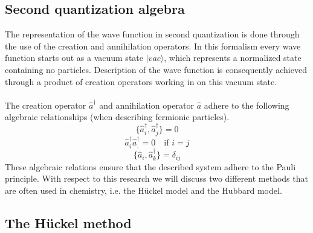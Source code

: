 \documentclass[12pt]{article}
\begin{document}
\subsection{Second quantization algebra}
The representation of the wave function in second quantization is done through the use of the creation and annihilation operators. In this formalism every wave function starts out as a vacuum state $\lvert vac \rangle$, which represents a normalized state containing no particles. Description of the wave function is consequently achieved through a product of creation operators working in on this vacuum state.
\\
\\
The creation operator $\hat{a}^\dagger$ and  annihilation operator $\hat{a}$ adhere to the following algebraic relationships (when describing fermionic particles).\cite{Surj1989}
\begin{equation}
	\{\hat{a}^\dagger_i, \hat{a}^\dagger_j\} = 0
\end{equation}
\begin{equation}
	\hat{a}^\dagger_i\hat{a}^\dagger_, = 0 \quad \text{if } i=j
\end{equation}
\begin{equation}
	\{\hat{a}_{i}, \hat{a}^{\dagger}_{k} \} = \delta_{ij}
\end{equation}
These algebraic relations ensure that the described system adhere to the Pauli principle. With respect to this research we will discuss two different methods that are often used in chemistry, i.e. the Hückel model and the Hubbard model.

\subsection{The Hückel method}
\end{document}
